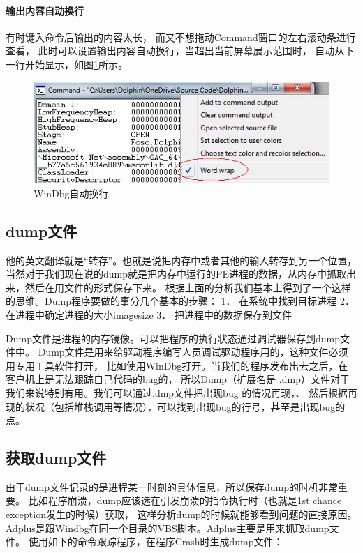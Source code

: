 \documentclass{book}
\begin{document}
\paragraph{输出内容自动换行}有时键入命令后输出的内容太长，
而又不想拖动Command窗口的左右滚动条进行查看，
此时可以设置输出内容自动换行，当超出当前屏幕展示范围时，
自动从下一行开始显示，如图\ref{fig:WinDbgAutoWrapWord}所示。

\begin{figure}[htbp]
	\centering
	\includegraphics[scale=1]{WinDbgAutoWrapWord.jpg}
	\caption{WinDbg自动换行}
	\label{fig:WinDbgAutoWrapWord}
\end{figure}


\subsection{dump文件}

他的英文翻译就是“转存”。也就是说把内存中或者其他的输入转存到另一个位置，
当然对于我们现在说的dump就是把内存中运行的PE进程的数据，从内存中抓取出来，然后在用文件的形式保存下来。 
根据上面的分析我们基本上得到了一个这样的思维。Dump程序要做的事分几个基本的步骤： 
1．  在系统中找到目标进程 
2．  在进程中确定进程的大小imagesize 
3．  把进程中的数据保存到文件 

Dump文件是进程的内存镜像。可以把程序的执行状态通过调试器保存到dump文件中。
Dump文件是用来给驱动程序编写人员调试驱动程序用的，这种文件必须用专用工具软件打开，
比如使用WinDbg打开。当我们的程序发布出去之后，在客户机上是无法跟踪自己代码的bug的，
所以Dump（扩展名是 .dmp）文件对于我们来说特别有用。我们可以通过.dmp文件把出现bug 的情况再现，、
然后根据再现的状况（包括堆栈调用等情况），可以找到出现bug的行号，甚至是出现bug的点。

\subsection{获取dump文件}

由于dump文件记录的是进程某一时刻的具体信息，所以保存dump的时机非常重要。
比如程序崩溃，dump应该选在引发崩溃的指令执行时（也就是1st chance exception发生的时候）获取，
这样分析dump的时候就能够看到问题的直接原因。
Adplus是跟Windbg在同一个目录的VBS脚本。Adplus主要是用来抓取dump文件。
使用如下的命令跟踪程序，在程序Crash时生成dump文件：
\end{document}
